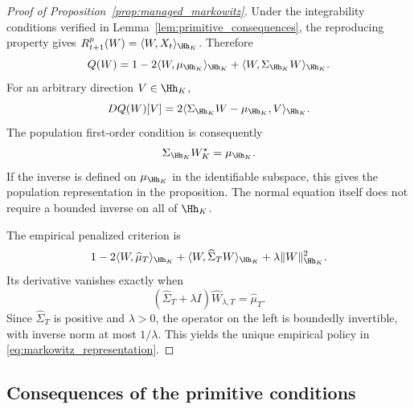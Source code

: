 \begin{proof}[Proof of Proposition~\ref{prop:managed_markowitz}]
Under the integrability conditions verified in
Lemma~\ref{lem:primitive_consequences}, the reproducing property gives
$R^p_{t+1}(W)=\langle W,X_t\rangle_{\Hh_K}$. Therefore
\[
Q(W)
=1-2\langle W,\mu_{\Hh_K}\rangle_{\Hh_K}
 +\langle W,\Sigma_{\Hh_K}W\rangle_{\Hh_K}.
\]
For an arbitrary direction $V\in\Hh_K$,
\[
DQ(W)[V]
=2\langle\Sigma_{\Hh_K}W-\mu_{\Hh_K},V\rangle_{\Hh_K}.
\]
The population first-order condition is consequently
\[
\Sigma_{\Hh_K}W_K^\star=\mu_{\Hh_K}.
\]
If the inverse is defined on $\mu_{\Hh_K}$ in the identifiable subspace,
this gives the population representation in the proposition. The normal
equation itself does not require a bounded inverse on all of $\Hh_K$.

The empirical penalized criterion is
\[
1-2\langle W,\widehat\mu_T\rangle_{\Hh_K}
 +\langle W,\widehat\Sigma_TW\rangle_{\Hh_K}
 +\lambda\|W\|_{\Hh_K}^2.
\]
Its derivative vanishes exactly when
\[
(\widehat\Sigma_T+\lambda I)\widehat W_{\lambda,T}=\widehat\mu_T.
\]
Since $\widehat\Sigma_T$ is positive and $\lambda>0$, the operator on the
left is boundedly invertible, with inverse norm at most $1/\lambda$.
This yields the unique empirical policy in
\eqref{eq:markowitz_representation}.
\end{proof}

\subsection{Consequences of the primitive conditions}
\label{app:primitive_consequences}

